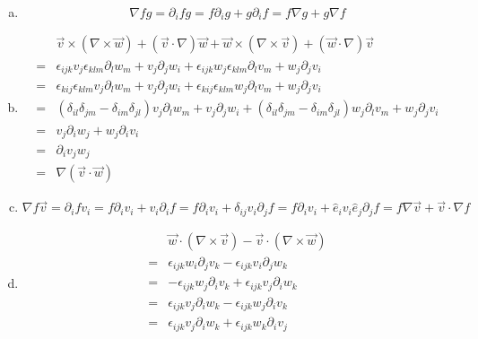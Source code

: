 \documentclass[a4paper,german,12pt,smallheadings]{scrartcl}
\begin{document}
\begin{enumerate}[a)]
  \item
    \begin{equation}
      \nabla fg = \partial_i f g = f \partial_i g + g \partial_i f = f \nabla g + g \nabla f
    \end{equation}
  \item
    \begin{align}
      &\vec{v} \times (\nabla \times \vec{w}) + (\vec{v} \cdot \nabla) \vec{w} + \vec{w} \times (\nabla \times \vec{v}) + (\vec{w} \cdot \nabla) \vec{v} \\
      = &\epsilon_{ijk} v_j \epsilon_{klm} \partial_l w_m + v_j \partial_j w_i + \epsilon_{ijk} w_j \epsilon_{klm} \partial_l v_m + w_j \partial_j v_i\\
      = &\epsilon_{kij} \epsilon_{klm} v_j \partial_l w_m + v_j \partial_j w_i + \epsilon_{kij} \epsilon_{klm} w_j \partial_l v_m + w_j \partial_j v_i\\
      = &(\delta_{il} \delta_{jm} - \delta_{im} \delta_{jl}) v_j \partial_l w_m + v_j \partial_j w_i + (\delta_{il} \delta_{jm} - \delta_{im}\delta_{jl}) w_j \partial_l v_m + w_j \partial_j v_i\\
      = &v_j \partial_i w_j + w_j \partial_i v_i\\
      = &\partial_i v_j w_j\\
      = &\nabla(\vec{v} \cdot \vec{w})
    \end{align}
  \item
    \begin{equation}
      \nabla f \vec{v}
      = \partial_i f v_i
      = f \partial_i v_i + v_i \partial_i f
      = f \partial_i v_i + \delta_{ij} v_i \partial_j f
      = f \partial_i v_i + \hat{e}_iv_i \hat{e}_j \partial_j f
      = f \nabla \vec{v} + \vec{v} \cdot \nabla f
    \end{equation}
  \item
    \begin{align}
      &\vec{w} \cdot (\nabla \times \vec{v}) - \vec{v} \cdot (\nabla \times \vec{w}) \\
      =  &\epsilon_{ijk}w_i\partial_jv_k - \epsilon_{ijk} v_i \partial_j w_k \\
      = &-\epsilon_{ijk} w_j \partial_ iv_k + \epsilon_{ijk} v_j \partial_i w_k \\
      =  &\epsilon_{ijk} v_j \partial_i w_k - \epsilon_{ijk} w_j \partial_i v_k \\
      =  &\epsilon_{ijk} v_j \partial_i w_k + \epsilon_{ijk} w_k \partial_i v_j \\

\end{align}
\end{enumerate}
\end{document}
